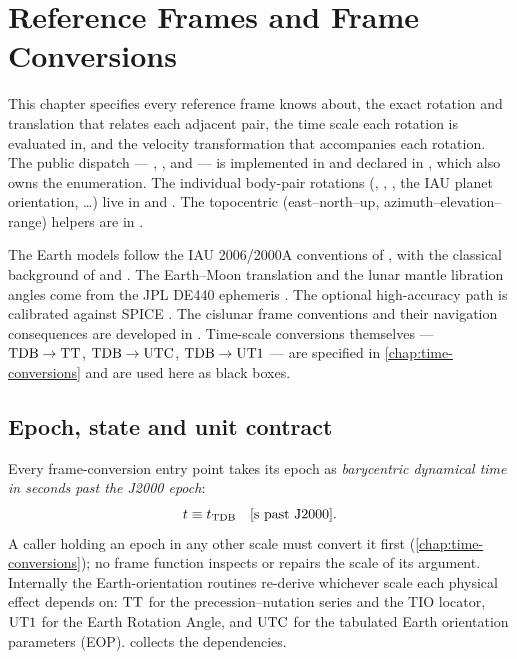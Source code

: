 \chapter{Reference Frames and Frame Conversions}
\label{chap:frame-conversions}

This chapter specifies every reference frame \lupnt{} knows about, the exact
rotation and translation that relates each adjacent pair, the time scale each
rotation is evaluated in, and the velocity transformation that accompanies
each rotation. The public dispatch --- ,
,  and
 --- is implemented in
 and declared in
, which also owns the
 enumeration. The individual body-pair rotations
(, , , the IAU planet
orientation, \dots) live in
 and
. The topocentric
(east--north--up, azimuth--elevation--range) helpers are in
.

The Earth models follow the IAU 2006/2000A conventions of
\citep{iers2010}, with the classical background of \citep{montenbruck2000}
and \citep{vallado2013}. The Earth--Moon translation and the lunar mantle
libration angles come from the JPL DE440 ephemeris \citep{park2021de440}.
The optional high-accuracy path is calibrated against
SPICE \citep{acton1996spice}. The cislunar frame conventions and their
navigation consequences are developed in \citep[Ch.~2]{iiyama2026thesis}.
Time-scale conversions themselves --- $\mathrm{TDB}\to\mathrm{TT}$, $\mathrm{TDB}\to\mathrm{UTC}$,
$\mathrm{TDB}\to\mathrm{UT1}$ --- are specified in \cref{chap:time-conversions} and are
used here as black boxes.

\section{Epoch, state and unit contract}
\label{sec:fc-contract}

Every frame-conversion entry point takes its epoch as \emph{barycentric
dynamical time in seconds past the J2000 epoch}:
%
\begin{equation}
  \label{eq:fc-epoch}
  t \equiv t_{\mathrm{TDB}}
  \quad [\si{\second}\ \text{past J2000}].
\end{equation}
%
A caller holding an epoch in any other scale must convert it first
(\cref{chap:time-conversions}); no frame function inspects or repairs the
scale of its argument. Internally the Earth-orientation routines re-derive
whichever scale each physical effect depends on:
$\mathrm{TT}$ for the precession--nutation series and the TIO locator, $\mathrm{UT1}$ for
the Earth Rotation Angle, and $\mathrm{UTC}$ for the tabulated Earth orientation
parameters (EOP).  collects the dependencies.

